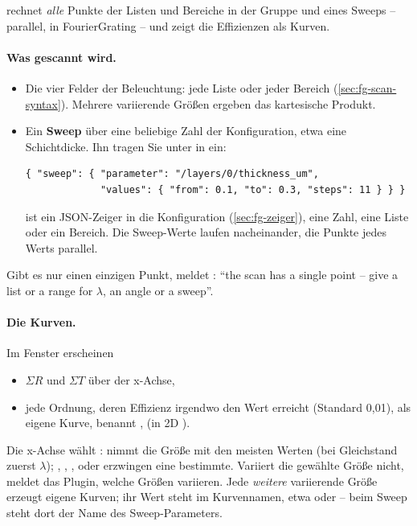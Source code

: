  rechnet \emph{alle} Punkte der Listen und Bereiche in der Gruppe  und
eines Sweeps -- parallel, in FourierGrating -- und zeigt die Effizienzen als Kurven.

\paragraph{Was gescannt wird.}
\begin{itemize}
  \item Die vier Felder der Beleuchtung: jede Liste oder jeder Bereich (\autoref{sec:fg-scan-syntax}).
    Mehrere variierende Größen ergeben das kartesische Produkt.
  \item Ein \textbf{Sweep} über eine beliebige Zahl der Konfiguration, etwa eine Schichtdicke.
    Ihn tragen Sie unter  in  ein:
\begin{lstlisting}
{ "sweep": { "parameter": "/layers/0/thickness_um",
             "values": { "from": 0.1, "to": 0.3, "steps": 11 } } }
\end{lstlisting}
     ist ein JSON-Zeiger in die Konfiguration (\autoref{sec:fg-zeiger}),
     eine Zahl, eine Liste oder ein Bereich. Die Sweep-Werte laufen nacheinander, die
    Punkte jedes Werts parallel.
\end{itemize}

Gibt es nur einen einzigen Punkt, meldet : \enquote{the scan has a single point – give a
list or a range for $\lambda$, an angle or a sweep}.

\paragraph{Die Kurven.} Im Fenster  erscheinen
\begin{itemize}
  \item $\Sigma R$ und $\Sigma T$ über der x-Achse,
  \item jede Ordnung, deren Effizienz irgendwo den Wert  erreicht
    (Standard 0,01), als eigene Kurve, benannt ,  (in 2D ).
\end{itemize}

Die x-Achse wählt :  nimmt die Größe mit den meisten Werten (bei Gleichstand
zuerst $\lambda$); , , ,  oder
 erzwingen eine bestimmte. Variiert die gewählte Größe nicht, meldet das Plugin,
welche Größen variieren. Jede \emph{weitere} variierende Größe erzeugt eigene Kurven; ihr Wert
steht im Kurvennamen, etwa  oder  -- beim Sweep steht dort der Name des Sweep-Parameters.

